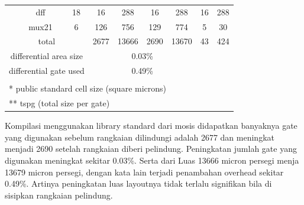 \begin{table}[htbp]
\begin{tabular}{lllllllll}
\cline{2-9}    \multicolumn{1}{c|}{} & \multicolumn{1}{c|}{dff} & \multicolumn{1}{c|}{18} & \multicolumn{1}{c|}{\cellcolor[rgb]{ .851,  .851,  .851}16} & \multicolumn{1}{c|}{288} & \multicolumn{1}{c|}{\cellcolor[rgb]{ .851,  .851,  .851}16} & \multicolumn{1}{c|}{288} & \multicolumn{1}{c|}{\cellcolor[rgb]{ .851,  .851,  .851}16} & \multicolumn{1}{c|}{288} \bigstrut\\
\cline{2-9}    \multicolumn{1}{c|}{} & \multicolumn{1}{c|}{mux21} & \multicolumn{1}{c|}{6} & \multicolumn{1}{c|}{\cellcolor[rgb]{ .851,  .851,  .851}126} & \multicolumn{1}{c|}{756} & \multicolumn{1}{c|}{\cellcolor[rgb]{ .851,  .851,  .851}129} & \multicolumn{1}{c|}{774} & \multicolumn{1}{c|}{\cellcolor[rgb]{ .851,  .851,  .851}5} & \multicolumn{1}{c|}{30} \bigstrut\\
    \hline
    \multicolumn{3}{|c|}{total} & \multicolumn{1}{c|}{2677} & \multicolumn{1}{c|}{13666} & \multicolumn{1}{c|}{2690} & \multicolumn{1}{c|}{13670} & \multicolumn{1}{c|}{43} & \multicolumn{1}{c|}{424} \bigstrut\\
    \hline
    \multicolumn{3}{|c|}{differential area size} & \multicolumn{4}{c|}{0.03\%}   & \multicolumn{2}{c|}{\multirow{2}[4]{*}{}} \bigstrut\\
\cline{1-7}    \multicolumn{3}{|c|}{differential gate used} & \multicolumn{4}{c|}{0.49\%}   & \multicolumn{2}{c|}{} \bigstrut\\
    \hline
    \multicolumn{9}{c}{} \bigstrut[t]\\
    \multicolumn{9}{l}{* public standard cell size (square microns)} \\
    \multicolumn{9}{l}{** tspg (total size per gate)} \\
    \end{tabular}%
  \label{tabaddlabel}%
\end{table}%


Kompilasi menggunakan library standard dari mosis didapatkan banyaknya gate yang digunakan sebelum rangkaian dilindungi adalah 2677 dan meningkat menjadi 2690 setelah rangkaian diberi pelindung. Peningkatan jumlah gate yang digunakan meningkat sekitar 0.03\%. Serta dari Luas 13666 micron persegi menja 13679 micron persegi, dengan kata lain terjadi penambahan overhead sekitar 0.49\%. Artinya peningkatan luas layoutnya tidak terlalu signifikan bila di sisipkan rangkaian pelindung.